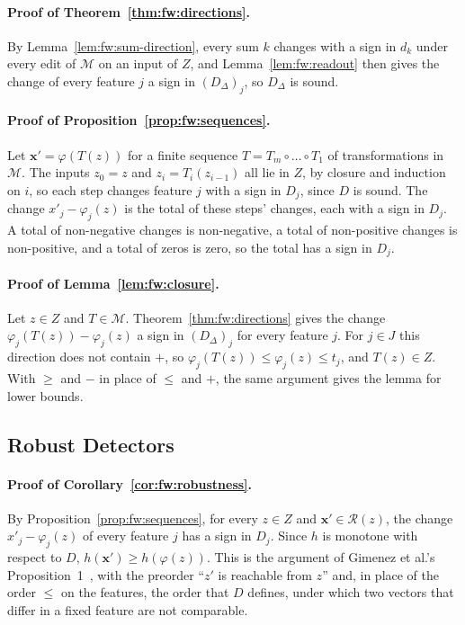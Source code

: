 \paragraph{Proof of Theorem~\ref{thm:fw:directions}.}
By Lemma~\ref{lem:fw:sum-direction}, every sum $k$ changes with a sign in $d_k$ under every edit of $\mathcal{M}$ on
an input of $Z$, and Lemma~\ref{lem:fw:readout} then gives the change of every feature $j$ a sign in
$(D_\Delta)_j$, so $D_\Delta$ is sound.

\paragraph{Proof of Proposition~\ref{prop:fw:sequences}.}
Let $\mathbf{x}' = \varphi(T(z))$ for a finite sequence $T = T_m \circ \dots \circ T_1$ of transformations in
$\mathcal{M}$. The inputs $z_0 = z$ and $z_i = T_i(z_{i-1})$ all lie in $Z$, by closure and induction on $i$, so each
step changes feature $j$ with a sign in $D_j$, since $D$ is sound. The change $x'_j - \varphi_j(z)$ is the total of
these steps' changes, each with a sign in $D_j$. A total of non-negative changes is non-negative, a total of
non-positive changes is non-positive, and a total of zeros is zero, so the total has a sign in $D_j$.

\paragraph{Proof of Lemma~\ref{lem:fw:closure}.}
Let $z \in Z$ and $T \in \mathcal{M}$. Theorem~\ref{thm:fw:directions} gives the change
$\varphi_j(T(z)) - \varphi_j(z)$ a sign in $(D_\Delta)_j$ for every feature $j$. For $j \in J$ this direction does not
contain $+$, so $\varphi_j(T(z)) \le \varphi_j(z) \le t_j$, and $T(z) \in Z$. With $\ge$ and $-$ in place of $\le$
and $+$, the same argument gives the lemma for lower bounds.

\subsection{Robust Detectors}
\label{sec:fw:proofs:robust}

\paragraph{Proof of Corollary~\ref{cor:fw:robustness}.}
By Proposition~\ref{prop:fw:sequences}, for every $z \in Z$ and $\mathbf{x}' \in \mathcal{R}(z)$, the change
$x'_j - \varphi_j(z)$ of every feature $j$ has a sign in $D_j$. Since $h$ is monotone with respect to $D$, $h(\mathbf{x}') \ge
h(\varphi(z))$. This is the argument of Gimenez et al.'s Proposition~1~\cite{gimenez2025certifiably}, with the preorder
``$z'$ is reachable from $z$'' and, in place of the order $\le$ on the features, the order that $D$ defines, under
which two vectors that differ in a fixed feature are not comparable.
